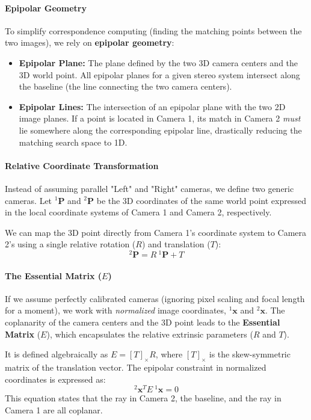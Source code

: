 \paragraph{Epipolar Geometry}
To simplify correspondence computing (finding the matching points between the two images), we rely on \textbf{epipolar geometry}:
\begin{itemize}
    \item \textbf{Epipolar Plane:} The plane defined by the two 3D camera centers and the 3D world point. All epipolar planes for a given stereo system intersect along the baseline (the line connecting the two camera centers).
    \item \textbf{Epipolar Lines:} The intersection of an epipolar plane with the two 2D image planes. If a point is located in Camera 1, its match in Camera 2 \textit{must} lie somewhere along the corresponding epipolar line, drastically reducing the matching search space to 1D.
\end{itemize}

\paragraph{Relative Coordinate Transformation}
Instead of assuming parallel "Left" and "Right" cameras, we define two generic cameras. Let $^1\boldsymbol{P}$ and $^2\boldsymbol{P}$ be the 3D coordinates of the same world point expressed in the local coordinate systems of Camera 1 and Camera 2, respectively. 

We can map the 3D point directly from Camera 1's coordinate system to Camera 2's using a single relative rotation ($R$) and translation ($T$):
\begin{equation}
    ^2\boldsymbol{P} = R \: ^1\boldsymbol{P} + T
    \label{eq:relative_transformation}
\end{equation}

\paragraph{The Essential Matrix ($E$)}
If we assume perfectly calibrated cameras (ignoring pixel scaling and focal length for a moment), we work with \textit{normalized} image coordinates, $^1\boldsymbol{x}$ and $^2\boldsymbol{x}$. The coplanarity of the camera centers and the 3D point leads to the \textbf{Essential Matrix} ($E$), which encapsulates the relative extrinsic parameters ($R$ and $T$).

It is defined algebraically as $E = [T]_\times R$, where $[T]_\times$ is the skew-symmetric matrix of the translation vector. The epipolar constraint in normalized coordinates is expressed as:
$$^2\boldsymbol{x}^T E \: ^1\boldsymbol{x} = 0$$
This equation states that the ray in Camera 2, the baseline, and the ray in Camera 1 are all coplanar.

